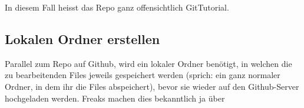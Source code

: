 \documentclass[twoside, 11pr]{article}
\begin{document}
\begin{figure}[!tbph]
\end{figure}

\noindent
In diesem Fall heisst das Repo ganz offensichtlich GitTutorial.

\subsection{Lokalen Ordner erstellen}
Parallel zum Repo auf Github, wird ein lokaler Ordner benötigt, in welchen die zu bearbeitenden Files jeweils gespeichert werden (sprich: ein ganz normaler Ordner, in dem ihr die Files abspeichert), bevor sie wieder auf den Github-Server hochgeladen werden. Freaks machen dies bekanntlich ja über
\end{document}
